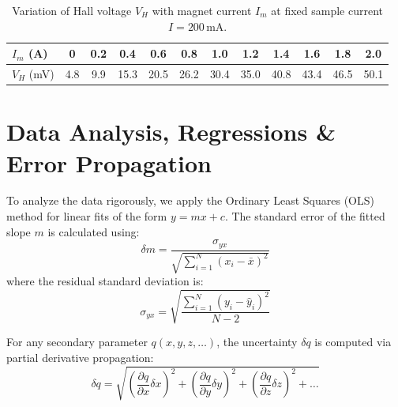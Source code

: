 \documentclass[a4paper,11pt]{article}
\begin{document}
\begin{table}[H]
\centering
\caption{Variation of Hall voltage \(V_H\) with magnet current \(I_m\) at fixed sample current \(I = 200\)\,mA.}
\label{tab:vh_vs_im}
\begin{tabular}{l *{11}{c}}
\toprule
\(I_m\) (A) & 0 & 0.2 & 0.4 & 0.6 & 0.8 & 1.0 & 1.2 & 1.4 & 1.6 & 1.8 & 2.0 \\
\midrule
\(V_H\) (mV) & 4.8 & 9.9 & 15.3 & 20.5 & 26.2 & 30.4 & 35.0 & 40.8 & 43.4 & 46.5 & 50.1 \\
\bottomrule
\end{tabular}
\end{table}

\section{Data Analysis, Regressions \& Error Propagation}

To analyze the data rigorously, we apply the Ordinary Least Squares (OLS) method for linear fits of the form $y = m x + c$. The standard error of the fitted slope $m$ is calculated using:
\begin{equation}
    \delta m = \frac{\sigma_{yx}}{\sqrt{\sum_{i=1}^N (x_i - \bar{x})^2}}
\end{equation}
where the residual standard deviation is:
\begin{equation}
    \sigma_{yx} = \sqrt{\frac{\sum_{i=1}^N (y_i - \hat{y}_i)^2}{N-2}}
\end{equation}

For any secondary parameter $q(x, y, z, \dots)$, the uncertainty $\delta q$ is computed via partial derivative propagation:
\begin{equation}
    \delta q = \sqrt{\left(\frac{\partial q}{\partial x} \delta x\right)^2 + \left(\frac{\partial q}{\partial y} \delta y\right)^2 + \left(\frac{\partial q}{\partial z} \delta z\right)^2 + \dots}
\end{equation}
\end{document}
